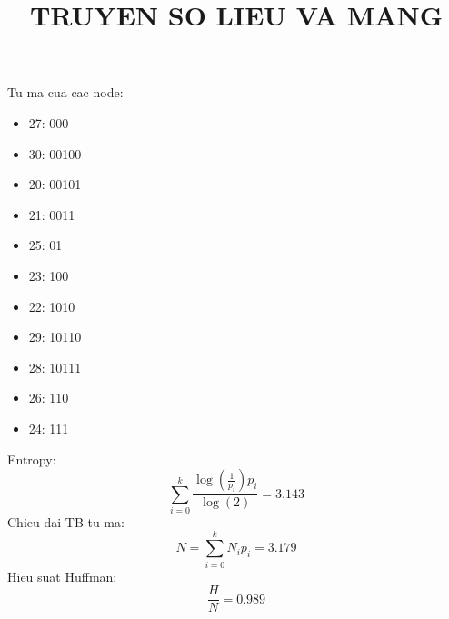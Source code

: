 \documentclass{article}
\title{TRUYEN SO LIEU VA MANG}
\begin{document}
Tu ma cua cac node: 
\begin{itemize}
\item 27: 000
\item 30: 00100
\item 20: 00101
\item 21: 0011
\item 25: 01
\item 23: 100
\item 22: 1010
\item 29: 10110
\item 28: 10111
\item 26: 110
\item 24: 111
\end{itemize}
Entropy:
\[
\sum_{i=0}^{k} \frac{\log{\left(\frac{1}{{p}_{i}} \right)} {p}_{i}}{\log{\left(2 \right)}} = 3.143
\]
Chieu dai TB tu ma:
\[
N = \sum_{i=0}^{k} {N}_{i} {p}_{i} = 3.179
\]
Hieu suat Huffman:
\[
\frac{H}{N} = 0.989
\]
\end{document}

